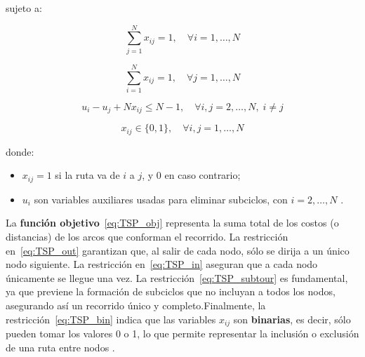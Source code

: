 \documentclass[12pt,titlepage,twoside,openright]{book}
\begin{document}
sujeto a:

\begin{equation}
	\sum_{j=1}^N x_{ij} = 1, \quad \forall i = 1,\dots,N
	\label{eq:TSP_out}
\end{equation}

\begin{equation}
	\sum_{i=1}^N x_{ij} = 1, \quad \forall j = 1,\dots,N
	\label{eq:TSP_in}
\end{equation}

\begin{equation}
	u_i - u_j + N x_{ij} \leq N - 1, \quad \forall i,j = 2,\dots,N, \; i \neq j
	\label{eq:TSP_subtour}
\end{equation}

\begin{equation}
	x_{ij} \in \{0,1\}, \quad \forall i,j = 1,\dots,N
	\label{eq:TSP_bin}
\end{equation}

\medskip

\noindent donde:
\begin{itemize}
    \item \(x_{ij} = 1\) si la ruta va de \(i\) a \(j\), y 0 en caso contrario;
    \item \(u_i\) son variables auxiliares usadas para eliminar subciclos, con \(i=2,\dots,N\) \citep{torres2018}.
\end{itemize}

La \textbf{función objetivo}~\eqref{eq:TSP_obj} representa la suma total de los costos (o distancias) de los arcos que conforman el recorrido. La restricción en~\eqref{eq:TSP_out} garantizan que, al salir de cada nodo, sólo se dirija a un único nodo siguiente. La restricción en~\eqref{eq:TSP_in} aseguran que a cada nodo únicamente se llegue una vez. La restricción~\eqref{eq:TSP_subtour} es fundamental, ya que previene la formación de subciclos que no incluyan a todos los nodos, asegurando así un recorrido único y completo.Finalmente, la restricción~\eqref{eq:TSP_bin} indica que las variables \(x_{ij}\) son \textbf{binarias}, es decir, sólo pueden tomar los valores 0 o 1, lo que permite representar la inclusión o exclusión de una ruta entre nodos \citep{torres2018}.
\end{document}
